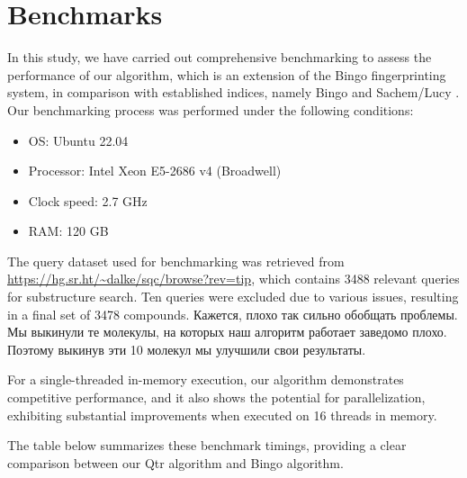 \section{Benchmarks}

In this study, we have carried out comprehensive benchmarking to assess the performance of our algorithm, which is an extension 
of the Bingo fingerprinting system, in comparison with established indices, namely Bingo \cite{Pavlov2010} and Sachem/Lucy \cite{Kratochvil2018}.
Our benchmarking process 
was performed under the following conditions:

\begin{itemize}
\item OS: Ubuntu 22.04
\item Processor: Intel Xeon E5-2686 v4 (Broadwell)
\item Clock speed: 2.7 GHz
\item RAM: 120 GB
\end{itemize}

The query dataset used for benchmarking was retrieved from \url{https://hg.sr.ht/~dalke/sqc/browse?rev=tip}, which contains 3488 
relevant queries for substructure search. Ten queries were excluded due to various issues, resulting in a final set of 3478 compounds.
{\color{red} Кажется, плохо так сильно обобщать проблемы. Мы выкинули те молекулы, на которых наш алгоритм работает заведомо плохо. Поэтому выкинув эти 10 молекул мы улучшили свои результаты}.

For a single-threaded in-memory execution, our algorithm demonstrates competitive performance, and it also shows the potential for 
parallelization, exhibiting substantial improvements when executed on 16 threads in memory.

The table below summarizes these benchmark timings, providing a clear comparison between our Qtr algorithm and Bingo algorithm.

